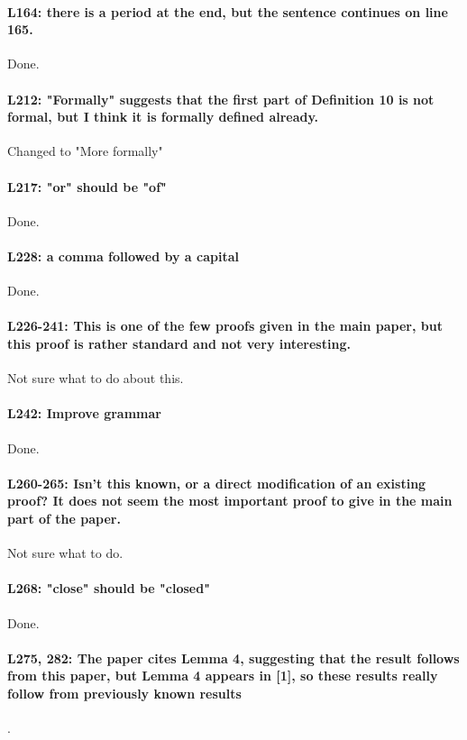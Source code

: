 \paragraph{L164: there is a period at the end, but the sentence continues on line 165.} Done.

\paragraph{L212: "Formally" suggests that the first part of Definition 10 is not formal, but I think it is formally defined already.} Changed to "More formally"

\paragraph{L217: "or" should be "of"} Done.

\paragraph{L228: a comma followed by a capital} Done.

\paragraph{L226-241: This is one of the few proofs given in the main paper, but this proof is rather standard and not very interesting.} Not sure what to do about this.

\paragraph{L242: Improve grammar} Done.

\paragraph{L260-265: Isn't this known, or a direct modification of an existing proof? It does not seem the most important proof to give in the main part of the paper.} Not sure what to do.

\paragraph{L268: "close" should be "closed"} Done.

\paragraph{L275, 282: The paper cites Lemma 4, suggesting that the result follows from this paper, but Lemma 4 appears in [1], so these results really follow from previously known results}.

